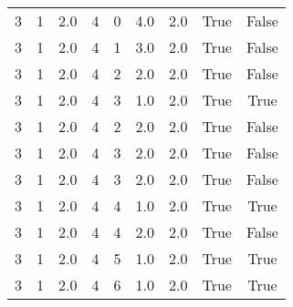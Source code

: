 \documentclass[a4paper,12pt]{article}
\begin{document}
\begin{center}
\begin{tabular}{ c c c | c c c | c | c | c}
        3 & 1 & 2.0 & 4 & 0 & 4.0 & 2.0 & True & False    \\
        3 & 1 & 2.0 & 4 & 1 & 3.0 & 2.0 & True & False    \\
        3 & 1 & 2.0 & 4 & 2 & 2.0 & 2.0 & True & False    \\
        3 & 1 & 2.0 & 4 & 3 & 1.0 & 2.0 & True & True     \\
        3 & 1 & 2.0 & 4 & 2 & 2.0 & 2.0 & True & False    \\
        3 & 1 & 2.0 & 4 & 3 & 2.0 & 2.0 & True & False    \\
        3 & 1 & 2.0 & 4 & 3 & 2.0 & 2.0 & True & False    \\
        3 & 1 & 2.0 & 4 & 4 & 1.0 & 2.0 & True & True     \\
        3 & 1 & 2.0 & 4 & 4 & 2.0 & 2.0 & True & False    \\
        3 & 1 & 2.0 & 4 & 5 & 1.0 & 2.0 & True & True     \\
        3 & 1 & 2.0 & 4 & 6 & 1.0 & 2.0 & True & True     \\
    \end{tabular}
\end{center}
\end{document}
